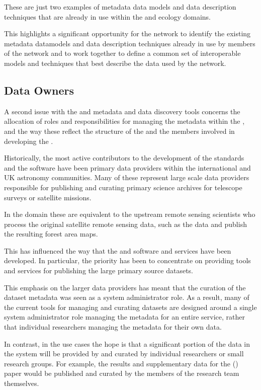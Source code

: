\documentclass{article}
\begin{document}
These are just two examples of metadata data models and data description
techniques that are already in use within the \cite{gis} and ecology domains.

This highlights a significant opportunity for the \cite{tropo} network to
identify the existing metadata datamodels and data description techniques
already in use by members of the \cite{tropo} network and to work together
to define a common set of interoperable models and techniques that best
describe the data used by the \cite{tropo} network.

\subsection{Data Owners}

A second issue with the \cite{ivoa} and \cite{astro} metadata \cite{ivoa-reg}
and data discovery tools concerns the allocation of roles and responsibilities
for managing the metadata within the \cite{ivoa-reg}, and the way these
reflect the structure of the \cite{ivoa} and the members involved in
developing the \cite{ivoa-reg}.

Historically, the most active contributors to the development of the
\cite{ivoa} standards and the \cite{astro} software have been primary data
providers within the international and UK astronomy communities.
Many of these represent large scale data providers responsible for
publishing and curating primary science archives for telescope surveys or
satellite missions.

In the \cite{tropo} domain these are equivalent to the upstream remote sensing
scientists who process the original satellite remote sensing data, such as the
\cite{landsat} data and publish the resulting forest area maps.

This has influenced the way that the \cite{ivoa} and \cite{astro} software
and services have been developed. In particular, the priority has been
to concentrate on providing tools and services for publishing the large
primary source datasets.

This emphasis on the larger data providers has meant that the curation of the
dataset metadata was seen as a system administrator role. As a result, many
of the current tools for managing and curating datasets are designed around a
single system administrator role managing the metadata for an entire service,
rather that individual researchers managing the metadata for their own data.

In contrast, in the \cite{atrop} use cases the hope is that a significant
portion of the data in the system will be provided by and curated by
individual researchers or small research groups.
For example, the results and supplementary data for the (\cite{mitchard-2014})
paper would be published and curated by the members of the research team
themselves.
\end{document}
